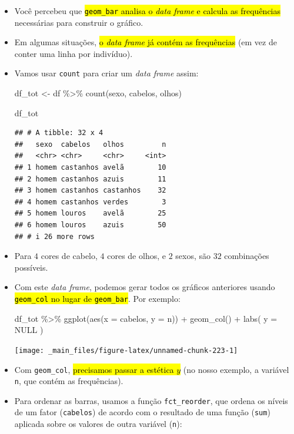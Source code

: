 \documentclass[
  11pt]{report}
\newenvironment{Shaded}{\begin{snugshade}}{\end{snugshade}}
\newcommand{\AttributeTok}[1]{\textcolor[rgb]{0.77,0.63,0.00}{#1}}
\newcommand{\ConstantTok}[1]{\textcolor[rgb]{0.00,0.00,0.00}{#1}}
\newcommand{\FunctionTok}[1]{\textcolor[rgb]{0.00,0.00,0.00}{#1}}
\newcommand{\NormalTok}[1]{#1}
\newcommand{\OtherTok}[1]{\textcolor[rgb]{0.56,0.35,0.01}{#1}}
\newcommand{\SpecialCharTok}[1]{\textcolor[rgb]{0.00,0.00,0.00}{#1}}
\renewenvironment{Shaded}{
    \begin{mdframed}[%
      roundcorner=2pt,%
      innerleftmargin=5pt,%
      innerrightmargin=5pt,%
      topline=true,%
      leftline=true,%
      rightline=true,%
      bottomline=true,%
      linewidth=0.5pt,%
      linecolor=black!20,%
      backgroundcolor=black!2,%
      skipabove=2ex,%
      skipbelow=2.5ex%
    ]%
  }
  {
    \end{mdframed}
  }
\begin{document}
\begin{itemize}
\item
  Você percebeu que {\hl{{\mbox{\texttt{geom\_bar}}} analisa o \emph{data frame} e calcula as frequências}} necessárias para construir o gráfico.
\item
  Em algumas situações, {\hl{o \emph{data frame} já contém as frequências}} (em vez de conter uma linha por indivíduo).
\item
  Vamos usar \texttt{count} para criar um \emph{data frame} assim:

\begin{Shaded}
\begin{Highlighting}[]
\NormalTok{df\_tot }\OtherTok{\textless{}{-}}\NormalTok{ df }\SpecialCharTok{\%\textgreater{}\%} 
  \FunctionTok{count}\NormalTok{(sexo, cabelos, olhos)}

\NormalTok{df\_tot}
\end{Highlighting}
\end{Shaded}

\begin{verbatim}
## # A tibble: 32 x 4
##   sexo  cabelos   olhos         n
##   <chr> <chr>     <chr>     <int>
## 1 homem castanhos avelã        10
## 2 homem castanhos azuis        11
## 3 homem castanhos castanhos    32
## 4 homem castanhos verdes        3
## 5 homem louros    avelã        25
## 6 homem louros    azuis        50
## # i 26 more rows
\end{verbatim}
\item
  Para $4$ cores de cabelo, $4$ cores de olhos, e $2$ sexos, são $32$ combinações possíveis.
\item
  Com este \emph{data frame}, podemos gerar todos os gráficos anteriores usando {\hl{{\mbox{\texttt{geom\_col}}} no lugar de {\mbox{\texttt{geom\_bar}}}}}. Por exemplo:

\begin{Shaded}
\begin{Highlighting}[]
\NormalTok{df\_tot }\SpecialCharTok{\%\textgreater{}\%} 
  \FunctionTok{ggplot}\NormalTok{(}\FunctionTok{aes}\NormalTok{(}\AttributeTok{x =}\NormalTok{ cabelos, }\AttributeTok{y =}\NormalTok{ n)) }\SpecialCharTok{+}
    \FunctionTok{geom\_col}\NormalTok{() }\SpecialCharTok{+}
    \FunctionTok{labs}\NormalTok{(}
      \AttributeTok{y =} \ConstantTok{NULL}
\NormalTok{    )}
\end{Highlighting}
\end{Shaded}

  \begin{center}\texttt{[image: \_main\_files/figure-latex/unnamed-chunk-223-1]} \end{center}
\item
  Com \texttt{geom\_col}, {\hl{precisamos passar a estética $y$}} (no nosso exemplo, a variável \texttt{n}, que contém as frequências).
\item
  Para ordenar as barras, usamos a função \texttt{fct\_reorder}, que ordena os níveis de um fator (\texttt{cabelos}) de acordo com o resultado de uma função (\texttt{sum}) aplicada sobre os valores de outra variável (\texttt{n}):


\end{itemize}
\end{document}
